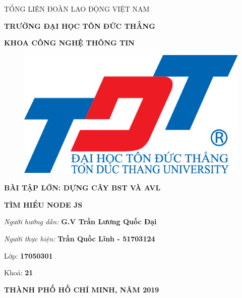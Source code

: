 \documentclass{report}
\begin{document}
\newcommand{\xfill}[2][1ex]{{%
  \dimen0=#2\advance\dimen0 by #1
  \leaders\hrule height \dimen0 depth -#1\hfill%
}}

\changefontsizes[14pt]{12pt}
\centerline{TỔNG LIÊN ĐOÀN LAO ĐỘNG VIỆT NAM}

\changefontsizes[14pt]{11pt}
\centerline{\textbf{TRƯỜNG ĐẠI HỌC TÔN ĐỨC THẮNG}}
\centerline{\textbf{KHOA CÔNG NGHỆ THÔNG TIN}}

\begin{center}
    \begin{figure}[htp]
    \begin{center}
     \includegraphics[scale=.2]{logo}
    \end{center}
    \end{figure}
\end{center}

\changefontsizes{16pt}
\centerline{\textbf{BÀI TẬP LỚN: DỰNG CÂY BST VÀ AVL}}
\vspace{1.5cm}
\changefontsizes{24pt}
\centerline{\textbf{TÌM HIỂU NODE JS}}

\vspace{4cm}
\begin{flushright}
\renewcommand{\baselinestretch}{0.05}
\changefontsizes{14pt}
\textit{Người hướng dẫn: }\textbf{G.V Trần Lương Quốc Đại}
\setlength{\parskip}{0.5em}

\textit{Người thực hiện: }\textbf{Trần Quốc Lĩnh - 51703124}
\setlength{\parskip}{0.5em}

Lớp: \textbf{17050301}
\setlength{\parskip}{0.5em}

Khoá: \textbf{21}
\setlength{\parskip}{0.5em}

\end{flushright}

\vspace{1cm}
\changefontsizes{14pt}
\centerline{\textbf{THÀNH PHỐ HỒ CHÍ MINH, NĂM 2019}}
\end{document}
